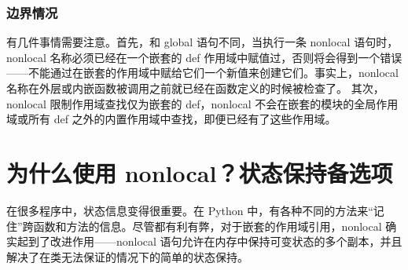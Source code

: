 \subsubsection*{边界情况}
有几件事情需要注意。首先，和 global 语句不同，当执行一条 nonlocal 语句时，nonlocal 名称必须已经在一个嵌套的 def 作用域中赋值过，否则将会得到一个错误——不能通过在嵌套的作用域中赋给它们一个新值来创建它们。事实上，nonlocal 名称在外层或内嵌函数被调用之前就已经在函数定义的时候被检查了。 其次，nonlocal 限制作用域查找仅为嵌套的 def，nonlocal 不会在嵌套的模块的全局作用域或所有 def 之外的内置作用域中查找，即便已经有了这些作用域。
\section{为什么使用 nonlocal？状态保持备选项}
在很多程序中，状态信息变得很重要。在 Python 中，有各种不同的方法来“记住”跨函数和方法的信息。尽管都有利有弊，对于嵌套的作用域引用，nonlocal 确实起到了改进作用——nonlocal 语句允许在内存中保持可变状态的多个副本，并且解决了在类无法保证的情况下的简单的状态保持。

